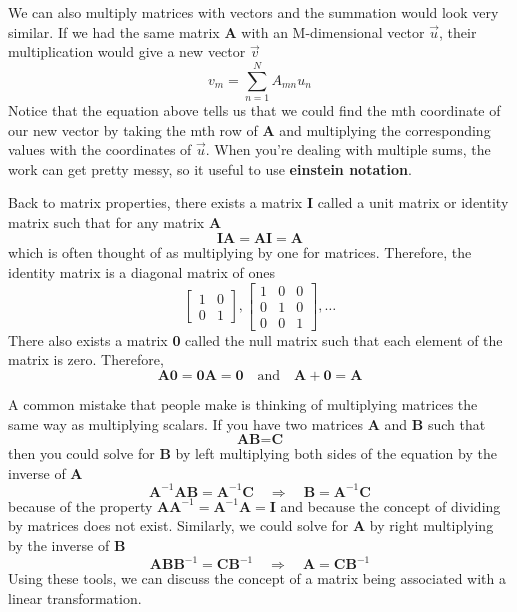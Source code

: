 \documentclass{article}
\newcommand{\be}{\begin{equation}}
\newcommand{\ee}{\end{equation}}
\begin{document}
We can also multiply matrices with vectors and the summation would look very similar.
If we had the same matrix \textbf{A} with an M-dimensional vector $\vec{u}$, their multiplication would give a new vector $\vec{v}$
\be
  v_{m} = \sum_{n=1}^{N} A_{mn} u_{n}
\ee
Notice that the equation above tells us that we could find the mth coordinate of our new vector by taking the mth row of \textbf{A} and multiplying the corresponding values with the coordinates of $\vec{u}$.
When you're dealing with multiple sums, the work can get pretty messy, so it useful to use \textbf{einstein notation}.

Back to matrix properties, there exists a matrix \textbf{I} called a unit matrix or identity matrix such that for any matrix \textbf{A}
\be
  \textbf{I} \textbf{A} = \textbf{A} \textbf{I} = \textbf{A}
\ee
which is often thought of as multiplying by one for matrices.
Therefore, the identity matrix is a diagonal matrix of ones
\be
\begin{bmatrix}
   1 & 0\\
   0 & 1
\end{bmatrix}
,
\begin{bmatrix}
   1 & 0 & 0\\
   0 & 1 & 0\\
   0 & 0 & 1
\end{bmatrix}
, \dots
\ee
There also exists a matrix \textbf{0} called the null matrix such that each element of the matrix is zero.
Therefore,
\be
  \textbf{A} \textbf{0} = \textbf{0} \textbf{A} = \textbf{0} \quad \text{and} \quad \textbf{A} + \textbf{0} = \textbf{A}
\ee

A common mistake that people make is thinking of multiplying matrices the same way as multiplying scalars.
If you have two matrices \textbf{A} and \textbf{B} such that
\be
  \textbf{A} \textbf{B} = \textbf{C}
\ee
then you could solve for \textbf{B} by left multiplying both sides of the equation by the inverse of \textbf{A}
\be
  \textbf{A}^{-1} \textbf{A} \textbf{B} = \textbf{A}^{-1} \textbf{C} \quad \Rightarrow \quad \textbf{B} = \textbf{A}^{-1} \textbf{C}
\ee
because of the property $\textbf{A} \textbf{A}^{-1} = \textbf{A}^{-1} \textbf{A} = \textbf{I}$ and because the concept of dividing by matrices does not exist.
Similarly, we could solve for \textbf{A} by right multiplying by the inverse of \textbf{B}
\be
  \textbf{A} \textbf{B} \textbf{B}^{-1} = \textbf{C} \textbf{B}^{-1} \quad \Rightarrow \quad \textbf{A} = \textbf{C} \textbf{B}^{-1}
\ee
Using these tools, we can discuss the concept of a matrix being associated with a linear transformation.
\end{document}
